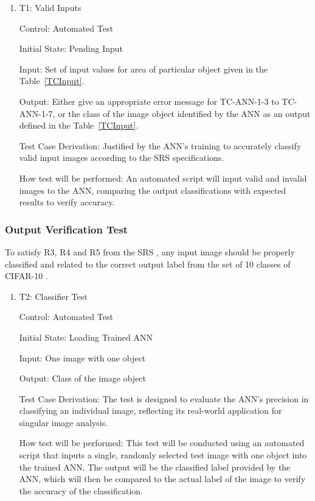 \documentclass[12pt, titlepage]{article}
\begin{document}
\begin{enumerate}

  \item{T1: Valid Inputs\\} 

  Control: Automated Test
  
  Initial State: Pending Input
  
  Input: Set of input values for area of particular object given in the Table~\ref{TCInput}.
  
  Output: Either give an appropriate error message for TC-ANN-1-3 to TC-ANN-1-7,
  or the class of the image object identified by the ANN as an output defined in the Table~\ref{TCInput}.
  
  Test Case Derivation: Justified by the ANN's training to accurately classify 
  valid input images according to the 
  SRS \cite{SRS} specifications.

  How test will be performed: An automated script will input valid and invalid images to the ANN, 
  comparing the output classifications with expected results to verify accuracy.

\end{enumerate}

\subsubsection{Output Verification Test} \label{OutputVerificationTest}
To satisfy R3, R4 and R5 from the 
SRS \cite{SRS}, any input image 
should be properly classified and related to the correct output label
from the set of 10 classes of CIFAR-10 \cite{CIFAR10}.

\begin{enumerate}

  \item{T2: Classifier Test\\} \label{T2}

  Control: Automated Test
  
  Initial State: Loading Trained ANN
  
  Input: One image with one object
  
  Output: Class of the image object
  
  Test Case Derivation: The test is designed to evaluate the ANN's precision in classifying an 
  individual image, reflecting its real-world application for singular image analysis.

  How test will be performed: This test will be conducted using an automated script that 
  inputs a single, randomly selected test image with one object into the trained ANN. 
  The output will be the classified label provided by 
   the ANN, which will then be compared to the actual label of the image to verify the accuracy of the classification.

\end{enumerate}
\end{document}
